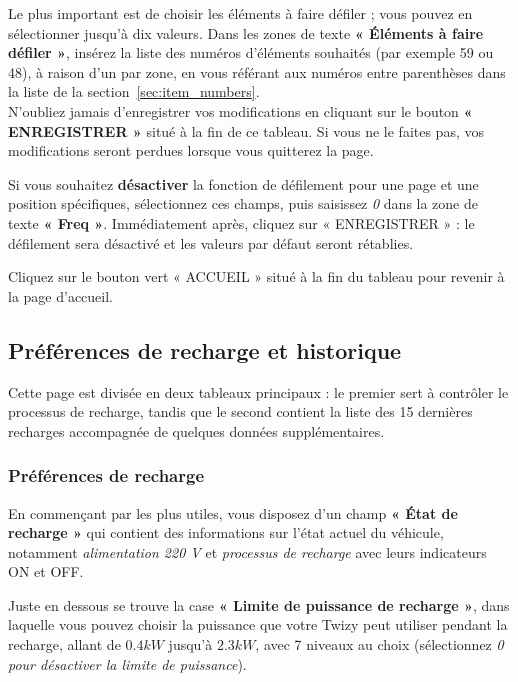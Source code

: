Le plus important est de choisir les éléments à faire défiler ; vous pouvez en sélectionner jusqu’à
dix valeurs. Dans les zones de texte \textbf{« Éléments à faire défiler »}, insérez la liste des
numéros d’éléments souhaités (par exemple 59 ou 48), à raison d’un par zone, en vous référant aux numéros entre
parenthèses dans la liste de la section~\ref{sec:item_numbers}.\\

N’oubliez jamais d’enregistrer vos modifications en cliquant sur le bouton \textbf{« ENREGISTRER »} situé à la fin de ce
tableau. Si vous ne le faites pas, vos modifications seront perdues lorsque vous quitterez la page.

Si vous souhaitez \textbf{désactiver} la fonction de défilement pour une page et une position spécifiques,
sélectionnez ces champs, puis saisissez \textit{0} dans la zone de texte \textbf{« Freq »}. Immédiatement après,
cliquez sur \textbfsur « ENREGISTRER » : le défilement sera désactivé et les valeurs par défaut seront rétablies.

Cliquez sur le bouton vert « ACCUEIL » situé à la fin du tableau pour revenir à la page d’accueil.



\subsection{Préférences de recharge et historique}
\label{sec:web_charging_prefs}

Cette page est divisée en deux tableaux principaux : le premier sert à contrôler le
processus de recharge, tandis que le second contient la liste des 15 dernières recharges accompagnée de quelques données supplémentaires.

\subsubsection{Préférences de recharge}

En commençant par les plus utiles, vous disposez d’un champ \textbf{« État de recharge »} qui contient des informations sur
l’état actuel du véhicule, notamment \textit{alimentation 220 V} et \textit{processus de recharge}
avec leurs indicateurs ON et OFF.

Juste en dessous se trouve la case \textbf{« Limite de puissance de recharge »}, dans laquelle vous pouvez choisir la
puissance que votre Twizy peut utiliser pendant la recharge, allant de $0.4 kW$  jusqu’à $2.3 kW$, avec
7 niveaux au choix (sélectionnez \textit{0 pour désactiver la limite de puissance}).

